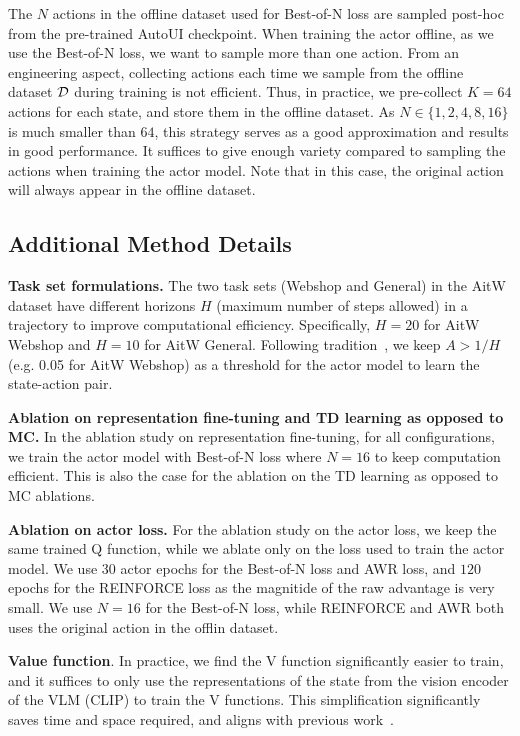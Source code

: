 The $N$ actions in the offline dataset used for Best-of-N loss are sampled post-hoc from the pre-trained AutoUI checkpoint. When training the actor offline, as we use the Best-of-N loss, we want to sample more than one action. From an engineering aspect, collecting actions each time we sample from the offline dataset $\mathcal{D}$ during training is not efficient. Thus, in practice, we pre-collect $K=64$ actions for each state, and store them in the offline dataset. As $N\in\{1,2,4,8,16\}$ is much smaller than $64$, this strategy serves as a good approximation and results in good performance. It suffices to give enough variety compared to sampling the actions when training the actor model. Note that in this case, the original action will always appear in the offline dataset.

\subsection{Additional Method Details} \label{app:additional-exp-details}

\textbf{Task set formulations.} The two task sets (Webshop and General) in the AitW dataset have different horizons $H$ (maximum number of steps allowed) in a trajectory to improve computational efficiency. Specifically, $H=20$ for AitW Webshop and $H=10$ for AitW General. Following tradition~\citep{bai2024digirltraininginthewilddevicecontrol}, we keep $A>1/H$ (e.g. 0.05 for AitW Webshop) as a threshold for the actor model to learn the state-action pair.

\textbf{Ablation on representation fine-tuning and TD learning as opposed to MC.} In the ablation study on representation fine-tuning, for all configurations, we train the actor model with Best-of-N loss where $N=16$ to keep computation efficient. This is also the case for the ablation on the TD learning as opposed to MC ablations.

\textbf{Ablation on actor loss.} For the ablation study on the actor loss, we keep the same trained Q function, while we ablate only on the loss used to train the actor model. We use $30$ actor epochs for the Best-of-N loss and AWR loss, and $120$ epochs for the REINFORCE loss as the magnitide of the raw advantage is very small. We use $N=16$ for the Best-of-N loss, while REINFORCE and AWR both uses the original action in the offlin dataset.

\textbf{Value function}. In practice, we find the V function significantly easier to train, and it suffices to only use the representations of the state from the vision encoder of the VLM (CLIP) to train the V functions. This simplification significantly saves time and space required, and aligns with previous work~\citep{bai2024digirltraininginthewilddevicecontrol}.

